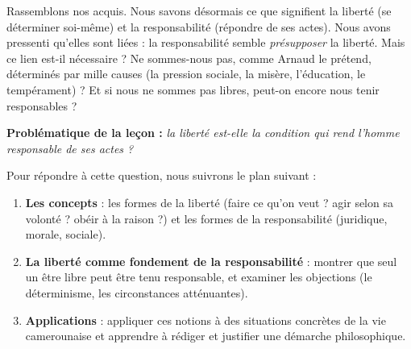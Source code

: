 \documentclass[11pt]{article}
\begin{document}
Rassemblons nos acquis. Nous savons désormais ce que signifient la liberté (se déterminer soi-même) et la responsabilité (répondre de ses actes). Nous avons pressenti qu'elles sont liées : la responsabilité semble \emph{présupposer} la liberté. Mais ce lien est-il nécessaire ? Ne sommes-nous pas, comme Arnaud le prétend, déterminés par mille causes (la pression sociale, la misère, l'éducation, le tempérament) ? Et si nous ne sommes pas libres, peut-on encore nous tenir responsables ?

\textbf{Problématique de la leçon :} \emph{la liberté est-elle la condition qui rend l'homme responsable de ses actes ?}

Pour répondre à cette question, nous suivrons le plan suivant :

\begin{enumerate}
\item \textbf{Les concepts} : les formes de la liberté (faire ce qu'on veut ? agir selon sa volonté ? obéir à la raison ?) et les formes de la responsabilité (juridique, morale, sociale).
\item \textbf{La liberté comme fondement de la responsabilité} : montrer que seul un être libre peut être tenu responsable, et examiner les objections (le déterminisme, les circonstances atténuantes).
\item \textbf{Applications} : appliquer ces notions à des situations concrètes de la vie camerounaise et apprendre à rédiger et justifier une démarche philosophique.
\end{enumerate}
\end{document}
